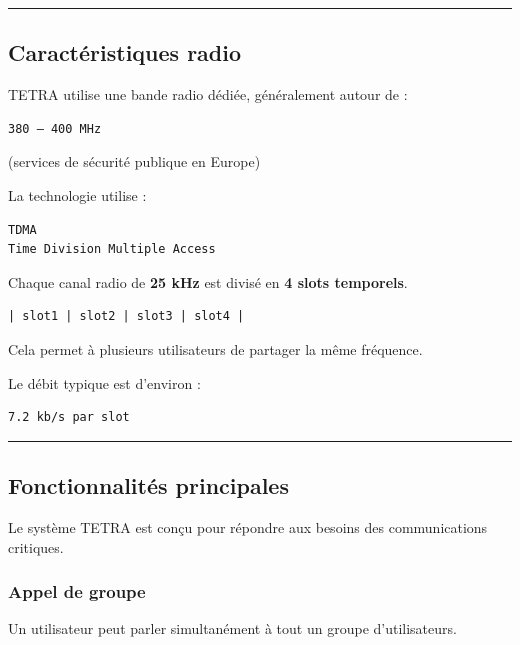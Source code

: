 \documentclass[
  french,
]{article}
\begin{document}
\begin{center}\rule{0.5\linewidth}{0.5pt}\end{center}

\subsection{Caractéristiques radio}\label{caractuxe9ristiques-radio}

TETRA utilise une bande radio dédiée, généralement autour de :

\begin{verbatim}
380 – 400 MHz
\end{verbatim}

(services de sécurité publique en Europe)

La technologie utilise :

\begin{verbatim}
TDMA
Time Division Multiple Access
\end{verbatim}

Chaque canal radio de \textbf{25 kHz} est divisé en \textbf{4 slots
temporels}.

\begin{verbatim}
| slot1 | slot2 | slot3 | slot4 |
\end{verbatim}

Cela permet à plusieurs utilisateurs de partager la même fréquence.

Le débit typique est d'environ :

\begin{verbatim}
7.2 kb/s par slot
\end{verbatim}

\begin{center}\rule{0.5\linewidth}{0.5pt}\end{center}

\subsection{Fonctionnalités
principales}\label{fonctionnalituxe9s-principales}

Le système TETRA est conçu pour répondre aux besoins des communications
critiques.

\subsubsection{Appel de groupe}\label{appel-de-groupe}

Un utilisateur peut parler simultanément à tout un groupe
d'utilisateurs.
\end{document}
